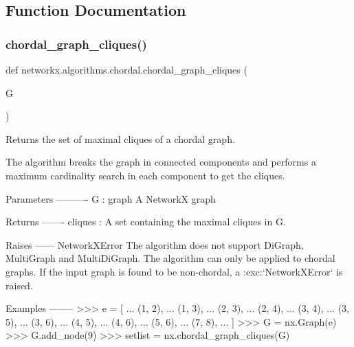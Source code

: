 \subsection{Function Documentation}
\mbox{\label{namespacenetworkx_1_1algorithms_1_1chordal_a1a3217ee59ce97387bc3973eb9e480cd}} 
\subsubsection{\texorpdfstring{chordal\+\_\+graph\+\_\+cliques()}{chordal\_graph\_cliques()}}
{\footnotesize\ttfamily def networkx.\+algorithms.\+chordal.\+chordal\+\_\+graph\+\_\+cliques (\begin{DoxyParamCaption}\item[{}]{G }\end{DoxyParamCaption})}

\begin{DoxyVerb}Returns the set of maximal cliques of a chordal graph.

The algorithm breaks the graph in connected components and performs a
maximum cardinality search in each component to get the cliques.

Parameters
----------
G : graph
  A NetworkX graph

Returns
-------
cliques : A set containing the maximal cliques in G.

Raises
------
NetworkXError
    The algorithm does not support DiGraph, MultiGraph and MultiDiGraph.
    The algorithm can only be applied to chordal graphs. If the input
    graph is found to be non-chordal, a :exc:`NetworkXError` is raised.

Examples
--------
>>> e = [
...     (1, 2),
...     (1, 3),
...     (2, 3),
...     (2, 4),
...     (3, 4),
...     (3, 5),
...     (3, 6),
...     (4, 5),
...     (4, 6),
...     (5, 6),
...     (7, 8),
... ]
>>> G = nx.Graph(e)
>>> G.add_node(9)
>>> setlist = nx.chordal_graph_cliques(G)
\end{DoxyVerb}
 \mbox{\label{namespacenetworkx_1_1algorithms_1_1chordal_aef7499130a6e6ada8058bebb4c2b6df8}} 
